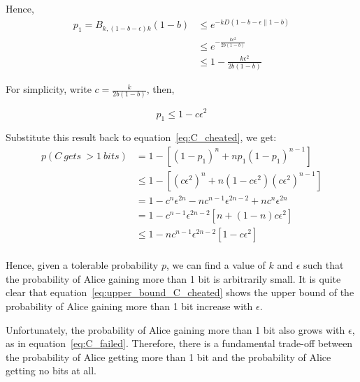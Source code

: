 \documentclass[%
 reprint,
superscriptaddress,
 amsmath,amssymb,
 aps,
]{revtex4-2}
\begin{document}
Hence, 
\begin{equation}
\begin{split}
p_1=B_{k, (1-b-\epsilon)k}(1-b)&\le e^{-kD\left(1-b-\epsilon\|1-b\right)}\\
&\le e^{-\frac{k\epsilon^2}{2b(1-b)}}\\
&\le 1-\frac{k\epsilon^2}{2b(1-b)}
\end{split}
\end{equation}

For simplicity, write $c=\frac{k}{2b(1-b)}$, then,

\begin{equation}
    p_1\le 1 - c\epsilon^2
\end{equation}

Substitute this result back to equation~\ref{eq:C_cheated}, we get:
\begin{equation}
    \begin{split}
        p(C\ gets\ > 1\ bits) &=1-\left[(1-p_1)^n+np_1(1-p_1)^{n-1}\right]\\
        &\le 1-\left[(c\epsilon^2)^n+n(1-c\epsilon^2)(c\epsilon^2)^{n-1}\right]\\
        &=1-c^n\epsilon^{2n}-nc^{n-1}\epsilon^{2n-2}+nc^n\epsilon^{2n}\\
        &=1-c^{n-1}\epsilon^{2n-2}\left[n+(1-n)c\epsilon^2\right]\\
        &\le 1-nc^{n-1}\epsilon^{2n-2}\left[1-c\epsilon^2\right]\\
    \end{split}
    \label{eq:upper_bound_C_cheated}
\end{equation}

Hence, given a tolerable probability $p$, we can find a value of $k$ and $\epsilon$ such that the probability of Alice gaining more than 1 bit is arbitrarily small. It is quite clear that equation~\ref{eq:upper_bound_C_cheated} shows the upper bound of the probability of Alice gaining more than 1 bit increase with $\epsilon$.

Unfortunately, the probability of Alice gaining more than 1 bit also grows with $\epsilon$, as in equation~\ref{eq:C_failed}. Therefore, there is a fundamental trade-off between the probability of Alice getting more than 1 bit and the probability of Alice getting no bits at all.
\end{document}
